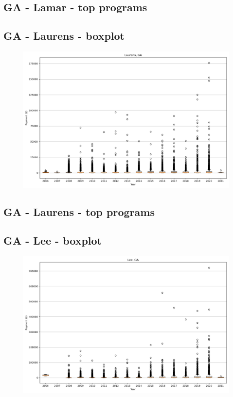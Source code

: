 \subsection*{GA - Lamar - top programs}

\newpage
\subsection*{GA - Laurens - boxplot}
\begin{figure}[h]
\centering
\includegraphics[width=7in]{../output/boxplots/counties/Laurens-GA_boxplot.png}
\end{figure}


\subsection*{GA - Laurens - top programs}

\newpage
\subsection*{GA - Lee - boxplot}
\begin{figure}[h]
\centering
\includegraphics[width=7in]{../output/boxplots/counties/Lee-GA_boxplot.png}
\end{figure}


